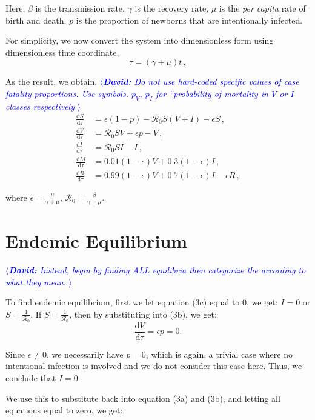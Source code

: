 \documentclass[12pt]{article}
\newcommand\dbyd[2]{\frac{\mathrm d{#1}}{\mathrm d{#2}}}
\newcommand{\R}{\mathcal{R}}
\newcommand{\david}[1]{\textcolor{blue}{$\langle${\slshape{\bfseries David:} #1 }$\rangle$}}
\newcommand{\pmV}{p_{V}}
\newcommand{\pmI}{p_{I}}
\begin{document}
Here, $\beta$ is the transmission rate, $\gamma$ is the recovery rate,
$\mu$ is the \emph{per capita} rate of birth and death, $p$ is the
proportion of newborns that are intentionally infected.

For simplicity, we now convert the system into dimensionless form using dimensionless time coordinate,
\begin{equation}
\tau=(\gamma+\mu)t \,,
\end{equation}

As the result, we obtain,
\david{Do not use hard-coded specific values of case fatality
  proportions.  Use symbols. $\pmV$, $\pmI$ for ``probability of
  mortality in $V$ or $I$ classes respectively}
\begin{subequations}\label{1}
\begin{align}
\dbyd{S}{\tau}&=\epsilon(1-p)- \R_0 S(V+I)-\epsilon S\,, \\
\dbyd{V}{\tau}&=\R_0 SV+\epsilon p-V\,,\\
\dbyd{I}{\tau}&=\R_0 SI-I\,,\\
\dbyd{M}{\tau}&=0.01(1-\epsilon) V+0.3(1-\epsilon) I\,,\\
\dbyd{R}{\tau}&=0.99(1-\epsilon) V+0.7(1-\epsilon) I-\epsilon R\,,
\end{align}
\end{subequations}

where $\epsilon=\frac{\mu}{\gamma+\mu}$, $\R_0=\frac{\beta}{\gamma+\mu}$.

\section{Endemic Equilibrium}

\david{Instead, begin by finding ALL equilibria then categorize the
  according to what they mean.}

To find endemic equilibrium, first we let equation (3c) equal to 0, we get: $I=0$ or $S=\frac{1}{\R_0}$. If $S=\frac{1}{\R_0}$, then by substituting into (3b), we get:
\begin{equation}
\dbyd{V}{\tau}=\epsilon p = 0.
\end{equation}

Since $\epsilon\neq0$, we necessarily have $p=0$, which is again, a trivial case where no intentional infection is involved and we do not consider this case here. Thus, we conclude that $I=0$.

We use this to substitute back into equation (3a) and (3b), and letting all equations equal to zero, we get:
\end{document}
